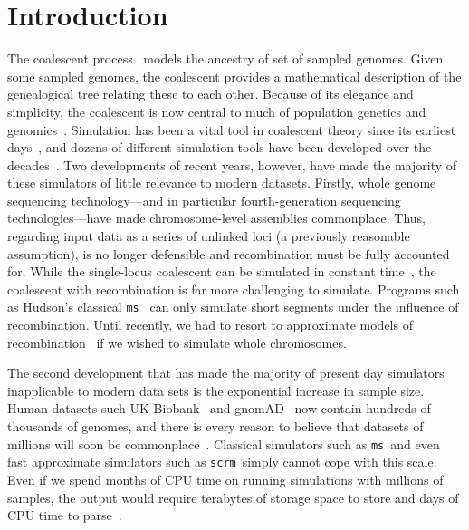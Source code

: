 \documentclass{article}
\newcommand{\ms}[0]{\texttt{ms}}
\newcommand{\scrm}[0]{\texttt{scrm}}
\begin{document}
\section*{Introduction}

The coalescent
process~\citep{kingman1982coalescent,hudson1983testing,tajima1983evolutionary}
models the ancestry of set of sampled genomes. Given some sampled
genomes, the coalescent provides a mathematical description of the
genealogical tree relating these to each other. Because of its
elegance and simplicity, the coalescent is now central to much of
population genetics and
genomics~\citep{hudson1990gene,hein2004gene,wakely2008coalescent}.
Simulation has been a vital
tool in coalescent theory since its earliest days~\citep{hudson1983testing},
and dozens of different simulation tools have been
developed over the decades~\citep{carvajal2008simulation,liu2008survey,
arenas2012simulation,yuan2012overview,hoban2012computer}.
Two developments of recent years, however, have made the majority
of these simulators of little relevance to modern datasets.
Firstly, whole genome sequencing technology---and in particular fourth-generation
sequencing technologies---have made chromosome-level assemblies
commonplace. Thus, regarding input data as a series of unlinked loci
(a previously reasonable assumption), is no longer defensible and
recombination must be fully accounted for. While the
single-locus coalescent can be simulated in constant
time~\citep{hudson1990gene}, the coalescent with recombination is
far more challenging to simulate.
Programs such as Hudson's classical \ms~\citep{hudson2002generating}
can only simulate short segments under the influence of recombination. 
Until recently, we had to resort to
approximate models of recombination~\citep{mcvean2005approximating,staab2014scrm}
if we wished to simulate whole chromosomes.

The second development that has made the majority of
present day simulators inapplicable to modern data sets is the
exponential increase in sample size. Human datasets such
UK Biobank~\citep{bycroft2018genome} and
gnomAD~\citep{karczewski2019variation} now contain hundreds of
thousands of genomes, and there is every reason to believe that
datasets of millions will soon be commonplace~\citep{stephens2015big}.
Classical simulators such as \ms\ and even fast approximate simulators
such as \scrm\ simply cannot cope with this scale. Even if we
spend months of CPU time on running simulations with millions of samples,
the output would require terabytes of storage space to store and
days of CPU time to parse~\citep{kelleher2016efficient}.
\end{document}
